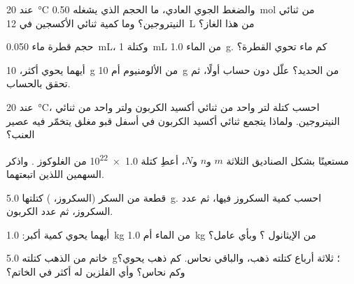 \begin{exercise}[$\star$]\label{exo:g10:the-mole:5}
عند \qty{20}{\celsius} والضغط الجوي العادي، ما الحجم الذي يشغله
\qty{0.50}{mol} من ثنائي النيتروجين؟ وما كمية ثنائي الأكسجين في
\qty{12}{L} من هذا الغاز؟
\end{exercise}

\begin{exercise}[$\star\star$]\label{exo:g10:the-mole:6}
حجم قطرة ماء \qty{0.050}{mL}، وكتلة \qty{1}{mL} من الماء
\qty{1.0}{g}. كم  ماء تحوي القطرة؟
\end{exercise}

\begin{exercise}[$\star\star$]\label{exo:g10:the-mole:7}
أيهما يحوي  أكثر، \qty{10}{g} من الألومنيوم أم \qty{10}{g} من
الحديد؟ علّل دون حساب أولًا، ثم تحقق بالحساب.
\end{exercise}

\begin{exercise}[$\star\star$]\label{exo:g10:the-mole:8}
عند \qty{20}{\celsius}، احسب كتلة لتر واحد من ثنائي أكسيد الكربون ولتر واحد
من ثنائي النيتروجين. ولماذا يتجمع ثنائي أكسيد الكربون في أسفل قبو مغلق يتخمّر
فيه عصير العنب؟
\end{exercise}

\begin{exercise}[$\star\star$]\label{exo:g10:the-mole:9}
مستعينًا بشكل الصناديق الثلاثة $m$ و$n$ و$N$، أعطِ كتلة
\num{1.0e22}  من الغلوكوز . واذكر السهمين
اللذين اتبعتهما.
\end{exercise}

\begin{exercise}[$\star\star$]\label{exo:g10:the-mole:10}
قطعة من السكر (السكروز، ) كتلتها \qty{5.0}{g}.
احسب كمية السكروز فيها، ثم عدد  السكروز، ثم عدد 
الكربون.
\end{exercise}

\begin{exercise}[$\star\star$]\label{exo:g10:the-mole:11}
أيهما يحوي كمية  أكبر: \qty{1.0}{kg} من الماء
 أم \qty{1.0}{kg} من الإيثانول ؟ وبأي عامل؟
\end{exercise}

\begin{exercise}[$\star\star\star$]\label{exo:g10:the-mole:12}
خاتم من الذهب كتلته \qty{5.0}{g}؛ ثلاثة أرباع كتلته ذهب، والباقي نحاس. كم 
ذهب يحوي؟ وكم  نحاس؟ وأي الفلزين له  أكثر في
الخاتم؟
\end{exercise}

